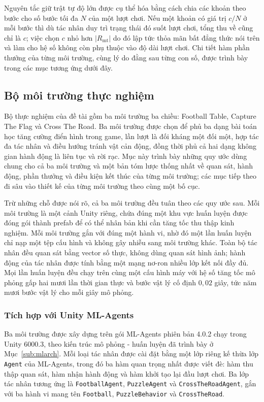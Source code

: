 \indent Nguyên tắc giữ trật tự độ lớn được cụ thể hóa bằng cách chia các khoản theo bước
cho số bước tối đa $N$ của một lượt chơi. Nếu một khoản có giá trị $c/N$ ở mỗi bước thì
dù tác nhân duy trì trạng thái đó suốt lượt chơi, tổng thu về cũng chỉ là $c$; việc chọn
$c$ nhỏ hơn $|R_{\mathrm{mt}}|$ do đó lập tức thỏa mãn bất đẳng thức nói trên và làm cho
hệ số không còn phụ thuộc vào độ dài lượt chơi. Chi tiết hàm phần thưởng của từng môi
trường, cùng lý do đằng sau từng con số, được trình bày trong các mục tương ứng dưới đây.

\subsection{Bộ môi trường thực nghiệm}
\label{sub:env-suite}

\indent Bộ thực nghiệm của đề tài gồm ba môi trường ba chiều: Football Table, Capture
The Flag và Cross The Road. Ba môi trường được chọn để phủ ba dạng bài toán học tăng
cường điển hình trong game, lần lượt là đối kháng một đối một, hợp tác đa tác nhân và
điều hướng tránh vật cản động, đồng thời phủ cả hai dạng không gian hành động là liên
tục và rời rạc. Mục này trình bày những quy ước dùng chung cho cả ba môi trường và một
bản tóm lược thống nhất về quan sát, hành động, phần thưởng và điều kiện kết thúc của
từng môi trường; các mục tiếp theo đi sâu vào thiết kế của từng môi trường theo cùng
một bố cục.

\indent Trừ những chỗ được nói rõ, cả ba môi trường đều tuân theo các quy ước sau. Mỗi
môi trường là một cảnh Unity riêng, chứa đúng một khu vực huấn luyện được đóng gói
thành prefab để có thể nhân bản khi cần tăng tốc thu thập kinh nghiệm. Mỗi môi trường
gắn với đúng một hành vi, nhờ đó một lần huấn luyện chỉ nạp một tệp cấu hình và không
gây nhiễu sang môi trường khác. Toàn bộ tác nhân đều quan sát bằng vector số thực,
không dùng quan sát hình ảnh; hành động của tác nhân được tính bằng một mạng nơ-ron
nhiều lớp kết nối đầy đủ. Mọi lần huấn luyện đều chạy trên cùng một cấu hình máy với
hệ số tăng tốc mô phỏng gấp hai mươi lần thời gian thực và bước vật lý cố định
$0{,}02$ giây, tức năm mươi bước vật lý cho mỗi giây mô phỏng.

\subsubsection{Tích hợp với Unity ML-Agents}
\label{sub:env-integration}
\indent Ba môi trường được xây dựng trên gói ML-Agents phiên bản 4.0.2 chạy trong
Unity 6000.3, theo kiến trúc mô phỏng - huấn luyện đã trình bày ở
Mục~\ref{sub:mlarch}. Mỗi loại tác nhân được cài đặt bằng một lớp riêng kế thừa lớp
\texttt{Agent} của ML-Agents, trong đó ba hàm quan trọng nhất được viết đè: hàm thu
thập quan sát, hàm nhận hành động và hàm khởi tạo lại đầu lượt chơi. Ba lớp tác nhân
tương ứng là \texttt{FootballAgent}, \texttt{PuzzleAgent} và
\texttt{CrossTheRoadAgent}, gắn với ba hành vi mang tên \texttt{Football},
\texttt{PuzzleBehavior} và \texttt{CrossTheRoad}.

